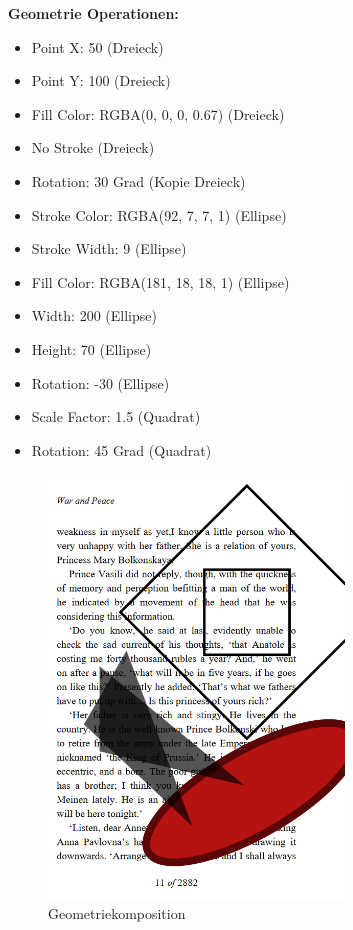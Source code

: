\textbf{Geometrie Operationen:}
\begin{itemize}
	\item Point X: 50 (Dreieck)
	\item Point Y: 100 (Dreieck)
	\item Fill Color: RGBA(0, 0, 0, 0.67) (Dreieck)
	\item No Stroke (Dreieck)
	\item Rotation: 30 Grad (Kopie Dreieck)
	\item Stroke Color: RGBA(92, 7, 7, 1) (Ellipse) 
	\item Stroke Width: 9 (Ellipse)
	\item Fill Color: RGBA(181, 18, 18, 1) (Ellipse)
	\item Width: 200 (Ellipse)
	\item Height: 70 (Ellipse)
	\item Rotation: -30 (Ellipse)
	\item Scale Factor: 1.5 (Quadrat)
	\item Rotation: 45 Grad (Quadrat)
\end{itemize}

\begin{figure}[!htbp]
	\centering
	\includegraphics[width=0.7\textwidth]{"images/shape-ops.png"}
	\caption{Geometriekomposition}
	\label{fig:shape-ops}
\end{figure}

